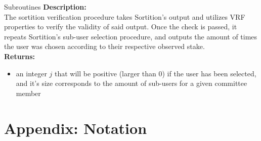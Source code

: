 \documentclass[10pt,a4paper]{article}
\begin{document}
\begin{section}{Subroutines}
\noindent \textbf{Description:}\\
The sortition verification procedure takes Sortition's output and utilizes 
VRF properties to verify the validity of said output.
Once the check is passed, it repeats Sortition's sub-user selection procedure, 
and outputs the amount of times the user was chosen according to their respective 
observed stake.\\

\noindent \textbf{Returns:}
\begin{itemize}
    \item an integer $j$ that will be positive (larger than 0) if the user has been 
    selected, and it's size corresponds to the amount
    of sub-users for a given committee member
  \end{itemize}


\end{section}
\section*{Appendix: Notation}
\end{document}
